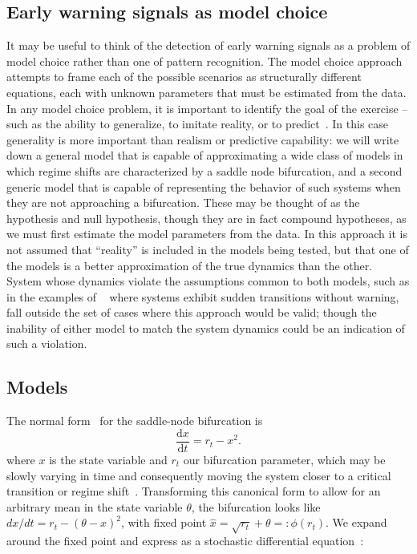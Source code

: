 \documentclass[authoryear,review,11pt]{elsarticle}
\newcommand{\ud}{\mathrm{d}}
\begin{document}
\subsection*{Early warning signals as model choice}
It may be useful to think of the detection of early warning signals
as a problem of model choice rather than one of pattern recognition.
The model choice approach attempts to frame each of the possible scenarios as structurally different equations,
each with unknown parameters that must be estimated from the data.
In any model choice problem, it is important to identify the goal of the exercise --
such as the ability to generalize, to imitate reality, or to predict~\citep{Levins1966}.
In this case generality is more important than realism or predictive capability:
we will write down a general model that is capable of approximating
a wide class of models in which regime shifts are characterized by a saddle node bifurcation,
and a second generic model that is capable of representing the behavior of such systems
when they are not approaching a bifurcation.
These may be thought of as the hypothesis and null hypothesis,
though they are in fact compound hypotheses,
as we must first estimate the model parameters from the data.
In this approach it is not assumed that ``reality'' is included in the models being tested,
but that one of the models is a better approximation of the true dynamics than the other.
System whose dynamics violate the assumptions common to both models,
such as in the examples of ~\citet{Hastings2010} where systems exhibit sudden transitions without warning,
fall outside the set of cases where this approach would be valid;
though the inability of either model to match the system dynamics could be an indication of such a violation.


\subsection*{Models}
The normal form~\citep{Guckenheimer1983, Kuehn2011} for the saddle-node bifurcation is
\begin{equation}
\frac{\ud x}{\ud t} = r_t- x^2.
\label{saddle-node}
\end{equation}
where $x$ is the state variable and $r_t$ our bifurcation parameter,
which may be slowly varying in time and
consequently moving the system closer to a critical transition or regime shift~\citep{Scheffer2009}.
Transforming this canonical form to allow for an arbitrary mean in the state variable $\theta$,
the bifurcation looks like \( dx/dt = r_t- (\theta-x)^2 \), with fixed point \(\hat x = \sqrt{r_t} +\theta =: \phi(r_t)\).
We expand around the fixed point and express as a stochastic differential equation~\citep[\emph{e.g.}][]{Gardiner2009}:
\end{document}
